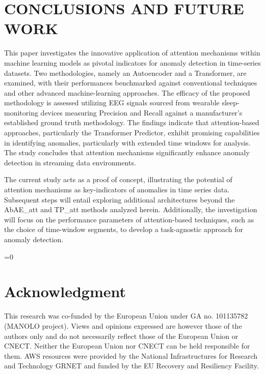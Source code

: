 \documentclass[conference]{IEEEtran}
\def\anon{0}
\begin{document}
\section{CONCLUSIONS AND FUTURE WORK}
\label{sec:conc}
This paper investigates the innovative application of attention mechanisms within machine learning models as pivotal indicators for anomaly detection in time-series datasets. Two methodologies, namely an Autoencoder and a Transformer, are examined, with their performances benchmarked against conventional techniques and other advanced machine-learning approaches. The efficacy of the proposed methodology is assessed utilizing EEG signals sourced from wearable sleep-monitoring devices measuring Precision and Recall against a manufacturer's established ground truth methodology. The findings indicate that attention-based approaches, particularly the Transformer Predictor, exhibit promising capabilities in identifying anomalies, particularly with extended time windows for analysis. The study concludes that attention mechanisms significantly enhance anomaly detection in streaming data environments.

The current study acts as a proof of concept, illustrating the potential of attention mechanisms as key-indicators of anomalies in time series data. Subsequent steps will entail exploring additional architectures beyond the AbAE\_att and TP\_att methods analyzed herein. Additionally, the investigation will focus on the performance parameters of attention-based techniques, such as the choice of time-window segments, to develop a task-agnostic approach for anomaly detection.



\ifnum\anon=0

\section*{Acknowledgment}

This research was co-funded by the European Union under GA no. 101135782 (MANOLO project). Views and opinions expressed are however those of the authors only and do not necessarily reflect those of the European Union or CNECT. Neither the European Union nor CNECT can be held responsible for them. AWS resources were provided by the National Infrastructures for Research and Technology GRNET and funded by the EU Recovery and Resiliency Facility.

\fi




\end{document}

